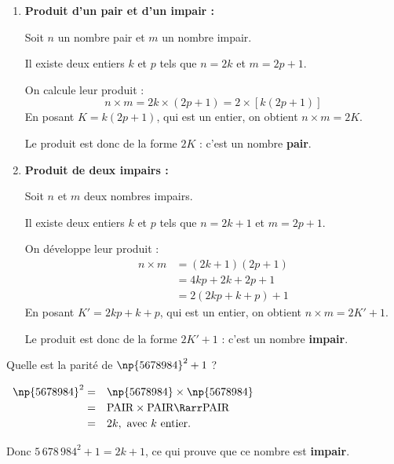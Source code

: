 \begin{demo}
	\nline
	\begin{enumerate}
		\item \textbf{Produit d'un pair et d'un impair :}

		      Soit $n$ un nombre pair et $m$ un nombre impair.

		      Il existe deux entiers $k$ et $p$ tels que $n = 2k$ et $m = 2p + 1$.

		      On calcule leur produit :
		      \[
			      n \times m = 2k \times (2p + 1) = 2 \times [k(2p + 1)]
		      \]
		      En posant $K = k(2p + 1)$, qui est un entier, on obtient $n \times m = 2K$.

		      Le produit est donc de la forme $2K$ : c'est un nombre \textbf{pair}.

		\item \textbf{Produit de deux impairs :}

		      Soit $n$ et $m$ deux nombres impairs.

		      Il existe deux entiers $k$ et $p$ tels que $n = 2k + 1$ et $m = 2p + 1$.

		      On développe leur produit :
		      \begin{align*}
			      n \times m & = (2k + 1)(2p + 1)   \\
			                 & = 4kp + 2k + 2p + 1  \\
			                 & = 2(2kp + k + p) + 1
		      \end{align*}
		      En posant $K' = 2kp + k + p$, qui est un entier, on obtient $n \times m = 2K' + 1$.

		      Le produit est donc de la forme $2K' + 1$ : c'est un nombre \textbf{impair}.
	\end{enumerate}
\end{demo}

\begin{methode}
	Quelle est la parité de $\np{5678984}^2 + 1$ ?

	\begin{correction}
		$\def\arraystretch{1.2}%
			\begin{array}{rl}%
				\np{5678984}^2 = & \np{5678984} \times \np{5678984}                 \\
				=                & \text{PAIR} \times \text{PAIR} \Rarr \text{PAIR} \\
				=                & 2k, \text{ avec } k \text{ entier.}
			\end{array}$%

		\ms

		Donc $5\,678\,984^2 + 1 = 2k + 1$, ce qui prouve que ce nombre est \textbf{impair}.
	\end{correction}
\end{methode}

